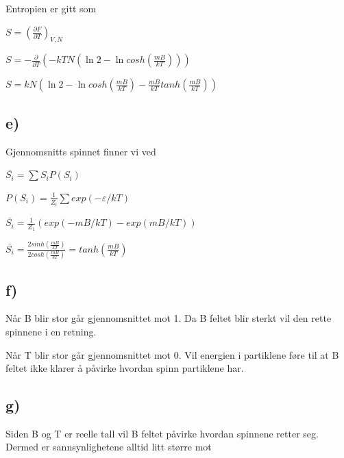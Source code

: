 \documentclass[14pt]{article}
\begin{document}
Entropien er gitt som

$S = (\frac{\partial F}{\partial T})_{V,N}$

$S = - \frac{\partial }{\partial T} (-kTN(\ln 2 -\ln cosh(\frac{mB}{kT})))$

$S = kN(\ln 2 -\ln cosh(\frac{mB}{kT}) - \frac{mB}{kT}tanh(\frac{mB}{kT}))$

\subsection*{e)}

Gjennomsnitts spinnet finner vi ved 

$ \bar{S_i} = \sum S_i P(S_i) $

$ P(S_i) = \frac{1}{Z_i}\sum exp(-\varepsilon / kT)$

$ \bar{S_i} = \frac{1}{Z_1} (exp(-mB/kT) - exp(mB/kT))$ 

$\bar{S_i} = \frac{2sinh(\frac{mB}{kT})}{2cosh(\frac{mB}{kT})} = tanh(\frac{mB}{kT})$

\subsection*{f)}

Når B blir stor går gjennomsnittet mot 1. Da B feltet blir sterkt vil den rette spinnene i en retning.  

Når T blir stor går gjennomsnittet mot 0. Vil energien i partiklene føre til at B feltet ikke klarer å påvirke hvordan spinn partiklene har. 

\subsection*{g)}

Siden B og T er reelle tall vil B feltet påvirke hvordan spinnene retter seg. Dermed er sannsynlighetene alltid litt større mot 
\end{document}
